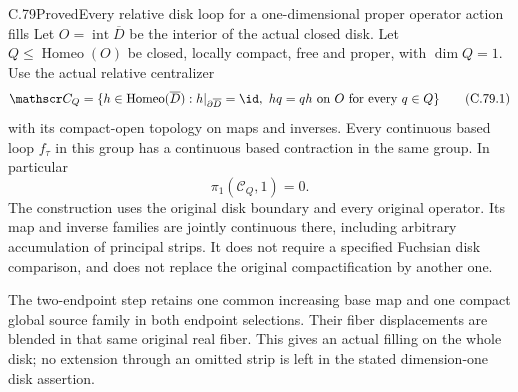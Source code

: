 \begin{claim}{C.79}{Proved}{Every relative disk loop for a one-dimensional proper operator action fills}
Let $O=\operatorname{int}\overline D$ be the interior
of the actual closed disk. Let
$Q\leq\operatorname{Homeo}(O)$ be closed, locally
compact, free and proper, with $\dim Q=1$.
Use the actual relative centralizer
\[
 \mathscr C_Q=
 \{h\in\operatorname{Homeo}(\overline D):
       h|_{\partial\overline D}=\id,
       \ hq=qh\text{ on }O\text{ for every }q\in Q\}
                                                               \tag{C.79.1}
\]
with its compact-open topology on maps and inverses.
Every continuous based loop $f_\tau$ in this group
has a continuous based contraction in the same group.
In particular
\[
                         \pi_1(\mathscr C_Q,1)=0.
                                                               \tag{C.79.2}
\]
The construction uses the original disk boundary
and every original operator. Its map and inverse
families are jointly continuous there, including
arbitrary accumulation of principal strips.
It does not require a specified Fuchsian disk
comparison, and does not replace the original
compactification by another one.

The two-endpoint step retains one common increasing
base map and one compact global source family in
both endpoint selections. Their fiber displacements
are blended in that same original real fiber.
This gives an actual filling on the whole disk;
no extension through an omitted strip is left in
the stated dimension-one disk assertion.
\end{claim}

